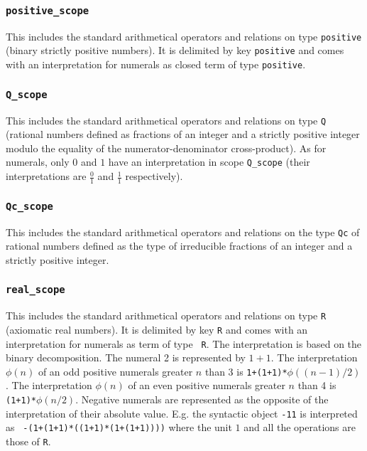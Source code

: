 \subsubsection{\tt positive\_scope}

This includes the standard arithmetical operators and relations on
type {\tt positive} (binary strictly positive numbers). It is
delimited by key {\tt positive} and comes with an interpretation for
numerals as closed term of type {\tt positive}.

\subsubsection{\tt Q\_scope}

This includes the standard arithmetical operators and relations on
type {\tt Q} (rational numbers defined as fractions of an integer and
a strictly positive integer modulo the equality of the
numerator-denominator cross-product). As for numerals, only $0$ and
$1$ have an interpretation in scope {\tt Q\_scope} (their
interpretations are $\frac{0}{1}$ and $\frac{1}{1}$ respectively).

\subsubsection{\tt Qc\_scope}

This includes the standard arithmetical operators and relations on the
type {\tt Qc} of rational numbers defined as the type of irreducible
fractions of an integer and a strictly positive integer.

\subsubsection{\tt real\_scope}

This includes the standard arithmetical operators and relations on
type {\tt R} (axiomatic real numbers). It is delimited by key {\tt R}
and comes with an interpretation for numerals as term of type {\tt
R}. The interpretation is based on the binary decomposition.  The
numeral 2 is represented by $1+1$.  The interpretation $\phi(n)$ of an
odd positive numerals greater $n$ than 3 is {\tt 1+(1+1)*$\phi((n-1)/2)$}.
The interpretation $\phi(n)$ of an even positive numerals greater $n$
than 4 is {\tt (1+1)*$\phi(n/2)$}.  Negative numerals are represented as the
opposite of the interpretation of their absolute value. E.g. the
syntactic object {\tt -11} is interpreted as {\tt
-(1+(1+1)*((1+1)*(1+(1+1))))} where the unit $1$ and all the operations are
those of {\tt R}.

